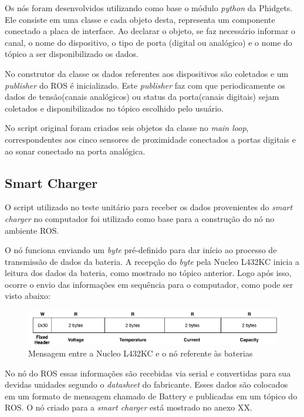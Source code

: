      Os nós foram desenvolvidos utilizando como base o módulo \textit{python} da Phidgets. Ele consiste em uma classe e cada objeto desta, representa um componente conectado a placa de interface. Ao declarar o objeto, se faz necessário informar o canal, o nome do dispositivo, o tipo de porta (digital ou analógico) e o nome do tópico a ser disponibilizado os dados. 
     
     No construtor da classe os dados referentes aos dispositivos são coletados e um \textit{publisher} do ROS é inicializado. Este  \textit{publisher} faz com que periodicamente os dados de tensão(canais analógicos) ou status da porta(canais digitais) sejam coletados e disponibilizados no tópico escolhido pelo usuário. 
     
     No script original foram criados seis objetos da classe no \textit{main loop}, correspondentes aos cinco sensores de proximidade conectados a portas digitais e ao sonar conectado na porta analógica.
     
\subsection{Smart Charger}
     
     O script utilizado no teste unitário para receber os dados provenientes do \textit{smart charger} no computador foi utilizado como base para a construção do nó no ambiente ROS.
     
     O nó funciona enviando um \textit{byte} pré-definido para dar início ao processo de transmissão de dados da bateria. A recepção do \textit{byte} pela Nucleo L432KC inicia a leitura dos dados da bateria, como mostrado no tópico anterior. Logo após isso, ocorre o envio das informações em sequência para o computador, como pode ser visto abaixo:
      
      \begin{figure}[!ht]
		   \centering
		   \includegraphics[width=16cm]{Figures/batt_protocol_2.png}
		   \caption{Mensagem entre a Nucleo L432KC e o nó referente às baterias}
		   \label{fig:battprotocol2}
		\end{figure}
		      
      No nó do ROS essas informações são recebidas via serial e convertidas para sua devidas unidades segundo o \textit{datasheet} do fabricante. Esses dados são colocados em um formato de mensagem chamado de Battery e publicadas em um tópico do ROS. O nó criado para a \textit{smart charger} está mostrado no anexo XX.
     
